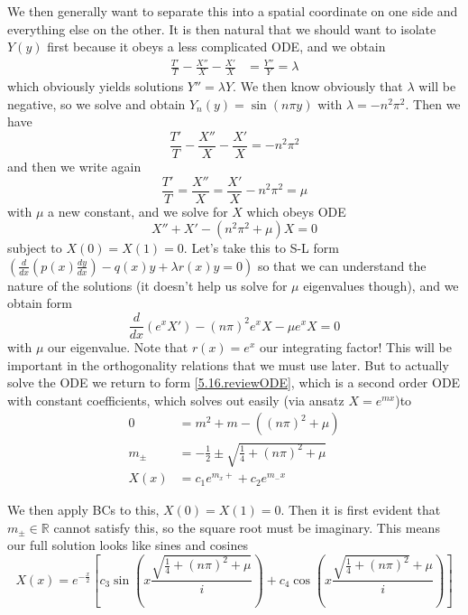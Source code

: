 \documentclass[10pt]{report}
\newcommand{\rd}[2]{\frac{d#1}{d#2}}
\begin{document}
We then generally want to separate this into a spatial coordinate on one side and everything else on the other. It is then natural that we should want to isolate $Y(y)$ first because it obeys a less complicated ODE, and we obtain
\begin{align}
    \frac{T'}{T} - \frac{X''}{X} - \frac{X'}{X} &= \frac{Y''}{Y} = \lambda
\end{align}
which obviously yields solutions $Y'' = \lambda Y$. We then know obviously that $\lambda$ will be negative, so we solve and obtain $Y_n(y) = \sin(n\pi y)$ with $\lambda = -n^2\pi^2$. Then we have
\begin{equation}
    \frac{T'}{T} - \frac{X''}{X} - \frac{X'}{X} = -n^2\pi^2
\end{equation}
and then we write again
\begin{equation}
    \frac{T'}{T} = \frac{X''}{X} = \frac{X'}{X}  -n^2\pi^2 = \mu
\end{equation}
with $\mu$ a new constant, and we solve for $X$ which obeys ODE
\begin{equation}
    X'' + X' - (n^2\pi^2 + \mu)X = 0\label{5.16.reviewODE}
\end{equation}
subject to $X(0) = X(1) = 0$. Let's take this to S-L form $\left(\rd{}{x}\left( p(x)\rd{y}{x} \right) - q(x)y + \lambda r(x)y = 0\right)$ so that we can understand the nature of the solutions (it doesn't help us solve for $\mu$ eigenvalues though), and we obtain form
\begin{equation}
    \rd{}{x}\left( e^xX' \right) - (n\pi)^2e^xX - \mu e^xX = 0
\end{equation}
with $\mu$ our eigenvalue. Note that $r(x) = e^x$ our integrating factor! This will be important in the orthogonality relations that we must use later. But to actually solve the ODE we return to form \eqref{5.16.reviewODE}, which is a second order ODE with constant coefficients, which solves out easily (via ansatz $X = e^{mx}$)to
\begin{align}
    0 &= m^2 + m - \left( (n\pi)^2 + \mu \right)\\
    m_\pm &= -\frac{1}{2} \pm \sqrt{\frac{1}{4} + (n\pi)^2 + \mu}\\
    X(x) &= c_1e^{m_x+} + c_2e^{m_-x}
\end{align}

We then apply BCs to this, $X(0) = X(1) = 0$. Then it is first evident that $m_{\pm} \in \mathbb{R}$ cannot satisfy this, so the square root must be imaginary. This means our full solution looks like sines and cosines
\begin{equation}
    X(x) = e^{-\frac{x}{2}}\left[ c_3\sin\left( x\frac{\sqrt{\frac{1}{4} + (n\pi)^2 + \mu}}{i} \right) + c_4\cos\left(x\frac{\sqrt{\frac{1}{4} + (n\pi)^2}+\mu}{i}\right) \right]
\end{equation}
\end{document}
